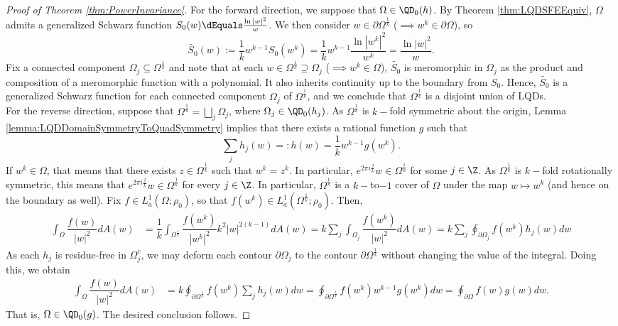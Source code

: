 \documentclass{article}
\numberwithin{equation}{section}
\begin{document}
\begin{proof}[Proof of Theorem \ref{thm:PowerInvariance}]
For the forward direction, we suppose that $\Omega\in\QD_0(h)$. By Theorem \ref{thm:LQDSFEEquiv}, $\Omega$ admits a generalized Schwarz function $S_0(w)\dEquals\frac{\ln|w|^2}{w}$. We then consider $w\in\partial\Omega^{\frac{1}{k}}$ ($\implies w^k\in\partial\Omega$), so
$$\widetilde{S_0}(w):=\frac{1}{k}w^{k-1}S_0(w^k)=\frac{1}{k}w^{k-1}\frac{\ln|w^k|^2}{w^k}=\frac{\ln|w|^2}{w}.$$
Fix a connected component $\Omega_j\subseteq\Omega^{\frac{1}{k}}$ and note that at each $w\in\Omega^{\frac{1}{k}}\supseteq\Omega_j$ ($\implies w^k\in\Omega$), $\widetilde{S_0}$ is meromorphic in $\Omega_j$ as the product and composition of a meromorphic function with a polynomial. It also inherits continuity up to the boundary from $S_0$. Hence, $\widetilde{S_0}$ is a generalized Schwarz function for each connected component $\Omega_j$ of $\Omega^{\frac{1}{k}}$, and we conclude that $\Omega^{\frac{1}{k}}$ is a disjoint union of LQDs.\\

For the reverse direction, suppose that $\Omega^{\frac{1}{k}}=\bigsqcup_{j}\Omega_j$, where $\Omega_j\in\QD_0(h_j)$. As $\Omega^{\frac{1}{k}}$ is $k-$fold symmetric about the origin, Lemma \ref{lemma:LQDDomainSymmetryToQuadSymmetry} implies that there exists a rational function $g$ such that
$$\sum_{j}h_j(w)=:h(w)=\frac{1}{k}w^{k-1}g(w^k).$$
If $w^k\in\Omega$, that means that there exists $z\in\Omega^{\frac{1}{k}}$ such that $w^k=z^k$. In particular, $e^{2\pi i\frac{j}{k}}w\in\Omega^{\frac{1}{k}}$ for some $j\in\Z$. As $\Omega^{\frac{1}{k}}$ is $k-$fold rotationally symmetric, this means that $e^{2\pi i\frac{j}{k}}w\in\Omega^{\frac{1}{k}}$ for every $j\in\Z$. In particular, $\Omega^{\frac{1}{k}}$ is a $k-$to$-1$ cover of $\Omega$ under the map $w\mapsto w^k$ (and hence on the boundary as well). Fix $f\in L_a^1(\Omega;\rho_0)$, so that $f(w^k)\in L_a^1(\Omega^{\frac{1}{k}};\rho_0)$. Then,
\begin{align*}
    \int_{\Omega}\dfrac{f(w)}{|w|^2}dA(w)&=\dfrac{1}{k}\int_{\Omega^{\frac{1}{k}}}\dfrac{f(w^k)}{|w^k|^2}k^2|w|^{2(k-1)}dA(w)=k\sum_j\int_{\Omega_j}\dfrac{f(w^k)}{|w|^2}dA(w)=k\sum_j\oint_{\partial\Omega_j}f(w^k)h_j(w)dw
\end{align*}
As each $h_j$ is residue-free in $\Omega_j^c$, we may deform each contour $\partial\Omega_j$ to the contour $\partial\Omega^{\frac{1}{k}}$ without changing the value of the integral. Doing this, we obtain
\begin{align*}
    \int_{\Omega}\dfrac{f(w)}{|w|^2}dA(w)&=k\oint_{\partial\Omega^{\frac{1}{k}}}f(w^k)\sum_jh_j(w)dw=\oint_{\partial\Omega^{\frac{1}{k}}}f(w^k)w^{k-1}g(w^k)dw=\oint_{\partial\Omega}f(w)g(w)dw.
\end{align*}
That is, $\Omega\in\QD_0(g)$. The desired conclusion follows.
\end{proof}
\end{document}
